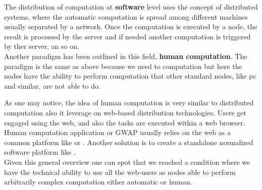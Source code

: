 The distribution of computation at \textbf{software} level uses the concept of
distributed systems, where the automatic computation is spread among different
machines usually separated by a network. Once the computation is executed by a
node, the result is processed by the server and if needed another computation is
triggered by ther server, an so on.\\

Another paradigm has been outlined in this field, \textbf{human computation}.
The paradigm is the same as above because we need to computation but here the nodes
have the ability to perform computation that other standard nodes, like pc and
similar, are not able to do.

As one may notice, the idea of human computation is very similar to distributed
computation also it leverage on web-based distribution technologies. Usere get
engaged using the web, and also the tasks are executed within a web browser.
Human computation application or \ac{GWAP} usually relies on the web as a common
platform like \cite{von2006peekaboom} or . Another solution is to
create a standalone normalized software platform like .\\


Given this general overview one can spot that we reached a condition where we have
the technical ability to use all the web-users as nodes able to perform arbitrarily
complex computation either automatic or human.

